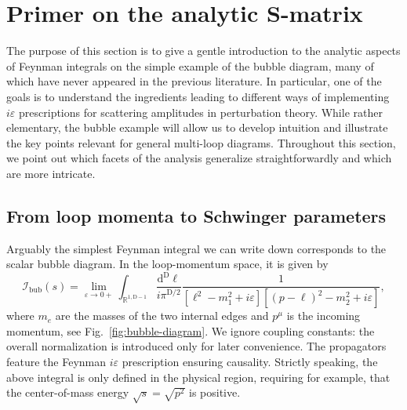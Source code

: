 \documentclass[12pt]{article}
\numberwithin{figure}{section}
\def \be {\begin{equation}}
\def \ee {\end{equation}}
\def \R {\mathbb{R}}
\def \D {\mathrm{D}}
\def \d {\mathrm{d}}
\def \eps {\varepsilon}
\def \I {\mathcal{I}}
\def \bubble {\mathrm{bub}}
\begin{document}
	
    \newpage
	\section{\label{sec:primer}Primer on the analytic S-matrix}
	
	The purpose of this section is to give a gentle introduction to the analytic aspects of Feynman integrals on the simple example of the bubble diagram, many of which have never appeared in the previous literature. In particular, one of the goals is to understand the ingredients leading to different ways of implementing $i \varepsilon$ prescriptions for scattering amplitudes in perturbation theory. While rather elementary, the bubble example will allow us to develop intuition and illustrate the key points relevant for general multi-loop diagrams. Throughout this section, we point out which facets of the analysis generalize straightforwardly and which are more intricate.
		
	
	\subsection{From loop momenta to Schwinger parameters}
	
	Arguably the simplest Feynman integral we can write down corresponds to the scalar bubble diagram. In the loop-momentum space, it is given by
	\be\label{eq:I-bubble-mom}
	\I_\bubble(s) = \lim_{\eps \to 0+} \int_{\R^{1,\D-1}} \frac{\d^\D \ell}{i\pi^{\D/2}} \frac{1}{[\ell^2 - m_1^2 + i\eps] [(p-\ell)^2 - m_2^2 + i\eps]},
	\ee
	where $m_e$ are the masses of the two internal edges and $p^\mu$ is the incoming momentum, see Fig.~\ref{fig:bubble-diagram}. We ignore coupling constants: the overall normalization is introduced only for later convenience. The propagators feature the Feynman $i\eps$ prescription ensuring causality. Strictly speaking, the above integral is only defined in the physical region, requiring for example, that the center-of-mass energy $\sqrt{s} = \sqrt{p^2}$ is positive.
	
	
	
\end{document}
